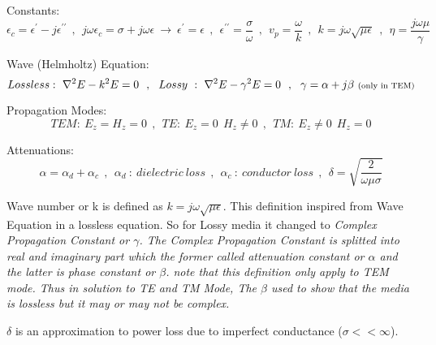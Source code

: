Constants:
$$ {\epsilon}_c = {\epsilon}^{\prime} - j {\epsilon}^{\prime\prime}  ~~ , ~~ j \omega {\epsilon}_c = \sigma + j \omega \epsilon ~ \rightarrow ~  {\epsilon}^\prime = {\epsilon} ~~ , ~~ {\epsilon}^{\prime\prime} = \frac{\sigma}{\omega}  ~~ , ~~ v_p = \frac{\omega}{k} ~~ , ~~ k = j \omega \sqrt{\mu \epsilon} ~~ , ~~  \eta = \frac{j \omega \mu}{\gamma} $$
\par
Wave (Helmholtz) Equation:
$$Lossless:~ \nabla^2 E - k^2 E = 0 ~~ , ~~ Lossy ~ : ~ \nabla^2 E - {\gamma}^2 E = 0 ~~ , ~~ \gamma = \alpha + j\beta~ \text{\scriptsize(only~in~TEM)}  $$
\par
Propagation Modes: 
$$TEM:~ E_z = H_z = 0 ~~ , ~~ TE:~ E_z = 0 ~~ H_z \neq 0 ~~ , ~~ TM:~ E_z \neq 0 ~~ H_z = 0 $$
\par
Attenuations: 
$$ \alpha = {\alpha}_d + {\alpha}_c ~~ , ~~ {\alpha}_d ~: ~ dielectric~loss ~~ , ~~ {\alpha}_c ~ : ~ conductor~loss  ~~ , ~~ \delta = \sqrt{\frac{2}{\omega \mu \sigma}} $$
\setlength{\parindent}{0.5cm} %
\par
Wave number or k is defined as $ k = j \omega \sqrt{\mu \epsilon} $. This definition inspired from Wave Equation in a lossless equation. So for Lossy media it changed to \it{Complex Propagation Constant} or $\gamma$.  The Complex Propagation Constant is splitted into real and imaginary part which the former called attenuation constant or $\alpha$ and the latter is phase constant or $\beta$. note that this definition only apply to TEM mode. Thus in solution to TE and TM Mode, The $\beta$ used to show that the media is lossless but it may or may not be complex.
\par
$\delta$ is an approximation to power loss due to imperfect conductance ($\sigma<<\infty$).
\par
\setlength{\parindent}{0.0cm} %

